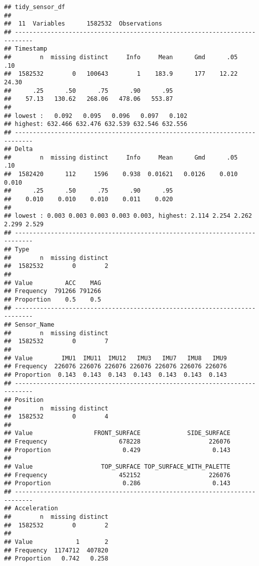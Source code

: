 \documentclass[]{article}
\begin{document}
\begin{verbatim}
## tidy_sensor_df 
## 
##  11  Variables      1582532  Observations
## ---------------------------------------------------------------------------
## Timestamp 
##        n  missing distinct     Info     Mean      Gmd      .05      .10 
##  1582532        0   100643        1    183.9      177    12.22    24.30 
##      .25      .50      .75      .90      .95 
##    57.13   130.62   268.06   478.06   553.87 
## 
## lowest :   0.092   0.095   0.096   0.097   0.102
## highest: 632.466 632.476 632.539 632.546 632.556
## ---------------------------------------------------------------------------
## Delta 
##        n  missing distinct     Info     Mean      Gmd      .05      .10 
##  1582420      112     1596    0.938  0.01621   0.0126    0.010    0.010 
##      .25      .50      .75      .90      .95 
##    0.010    0.010    0.010    0.011    0.020 
## 
## lowest : 0.003 0.003 0.003 0.003 0.003, highest: 2.114 2.254 2.262 2.299 2.529
## ---------------------------------------------------------------------------
## Type 
##        n  missing distinct 
##  1582532        0        2 
##                         
## Value         ACC    MAG
## Frequency  791266 791266
## Proportion    0.5    0.5
## ---------------------------------------------------------------------------
## Sensor_Name 
##        n  missing distinct 
##  1582532        0        7 
##                                                            
## Value        IMU1  IMU11  IMU12   IMU3   IMU7   IMU8   IMU9
## Frequency  226076 226076 226076 226076 226076 226076 226076
## Proportion  0.143  0.143  0.143  0.143  0.143  0.143  0.143
## ---------------------------------------------------------------------------
## Position 
##        n  missing distinct 
##  1582532        0        4 
##                                                             
## Value                 FRONT_SURFACE             SIDE_SURFACE
## Frequency                    678228                   226076
## Proportion                    0.429                    0.143
##                                                             
## Value                   TOP_SURFACE TOP_SURFACE_WITH_PALETTE
## Frequency                    452152                   226076
## Proportion                    0.286                    0.143
## ---------------------------------------------------------------------------
## Acceleration 
##        n  missing distinct 
##  1582532        0        2 
##                           
## Value            1       2
## Frequency  1174712  407820
## Proportion   0.742   0.258

\end{verbatim}
\end{document}

